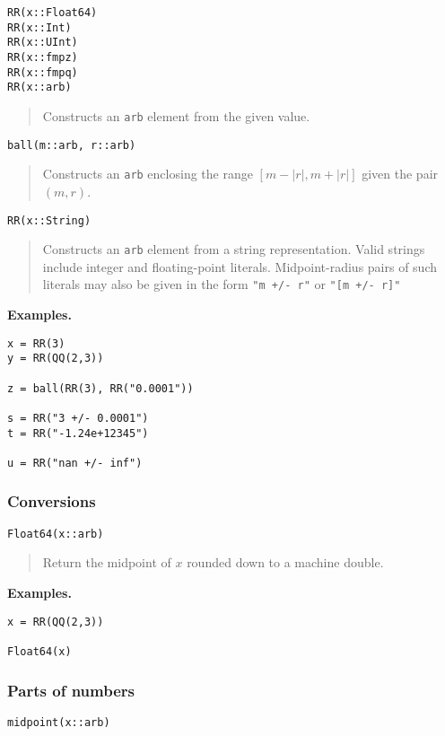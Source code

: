 \documentclass[a4paper,10pt]{article}
\newcommand{\code}{\lstinline}
\newcommand{\desc}[1]{\vspace{-3mm}\begin{quote}#1\end{quote}}
\begin{document}
{{\begin{lstlisting}
RR(x::Float64)
RR(x::Int)
RR(x::UInt)
RR(x::fmpz)
RR(x::fmpq)
RR(x::arb)
\end{lstlisting}

\desc{Constructs an \code{arb} element from the given value.}

\begin{lstlisting}
ball(m::arb, r::arb)
\end{lstlisting}

\desc{Constructs an \code{arb} enclosing the range $[m-|r|, m+|r|]$ given
the pair $(m, r)$.}

\begin{lstlisting}
RR(x::String)
\end{lstlisting}

\desc{Constructs an \code{arb} element from a string representation.
Valid strings include integer and floating-point literals. Midpoint-radius
pairs of such literals may also be given in the form \code{"m +/- r"}
or \code{"[m +/- r]"}}

\textbf{Examples.}

\begin{lstlisting}
x = RR(3)
y = RR(QQ(2,3))

z = ball(RR(3), RR("0.0001"))

s = RR("3 +/- 0.0001")
t = RR("-1.24e+12345")

u = RR("nan +/- inf")
\end{lstlisting}

\subsubsection{Conversions}

\begin{lstlisting}
Float64(x::arb)
\end{lstlisting}

\desc{Return the midpoint of $x$ rounded down to a machine double.}

\textbf{Examples.}

\begin{lstlisting}
x = RR(QQ(2,3))

Float64(x)
\end{lstlisting}

\subsubsection{Parts of numbers}

\begin{lstlisting}
midpoint(x::arb)


\end{lstlisting}}}
\end{document}
